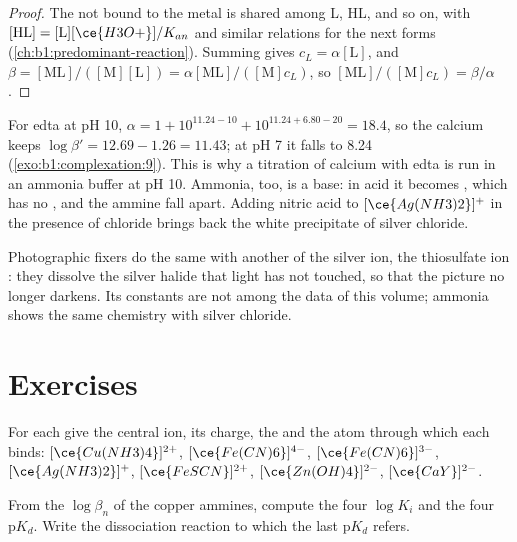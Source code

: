 \begin{proof}
The  not bound to the metal is shared among L, HL,  and
so on, with $[\mathrm{HL}] = [\mathrm{L}][\ce{H3O+}]/K_{an}$ and similar
relations for the next forms (\cref{ch:b1:predominant-reaction}). Summing gives $c_L = \alpha[\mathrm{L}]$,
and $\beta = [\mathrm{ML}]/([\mathrm{M}][\mathrm{L}]) =
\alpha[\mathrm{ML}]/([\mathrm{M}]c_L)$, so $[\mathrm{ML}]/([\mathrm{M}]c_L)
= \beta/\alpha$.
\end{proof}

For edta at pH 10, $\alpha = 1 + 10^{11.24 - 10} + 10^{11.24 + 6.80 - 20}
= 18.4$, so the calcium  keeps $\log\beta' = 12.69 - 1.26 = 11.43$;
at pH 7 it falls to 8.24 (\cref{exo:b1:complexation:9}). This is why a
titration of calcium with edta is run in an ammonia buffer at pH 10.
Ammonia, too, is a base: in acid it becomes , which has no , and the ammine  fall apart. Adding nitric acid to
$[\ce{Ag(NH3)2}]^{+}$ in the presence of chloride brings back the white
precipitate of silver chloride.

Photographic fixers do the same with another  of the silver ion,
the thiosulfate ion : they dissolve the silver halide that
light has not touched, so that the picture no longer darkens. Its
constants are not among the data of this volume; ammonia shows the same
chemistry with silver chloride.

\section{Exercises}

\begin{exercise}[$\star$]\label{exo:b1:complexation:1}
For each  give the central ion, its charge, the  and the
atom through which each  binds: $[\ce{Cu(NH3)4}]^{2+}$,
$[\ce{Fe(CN)6}]^{4-}$, $[\ce{Fe(CN)6}]^{3-}$, $[\ce{Ag(NH3)2}]^{+}$,
$[\ce{FeSCN}]^{2+}$, $[\ce{Zn(OH)4}]^{2-}$, $[\ce{CaY}]^{2-}$.
\end{exercise}

\begin{exercise}[$\star$]\label{exo:b1:complexation:2}
From the $\log\beta_n$ of the copper ammines, compute the four $\log K_i$
and the four $\mathrm{p}K_d$. Write the dissociation reaction to which
the last $\mathrm{p}K_d$ refers.
\end{exercise}

